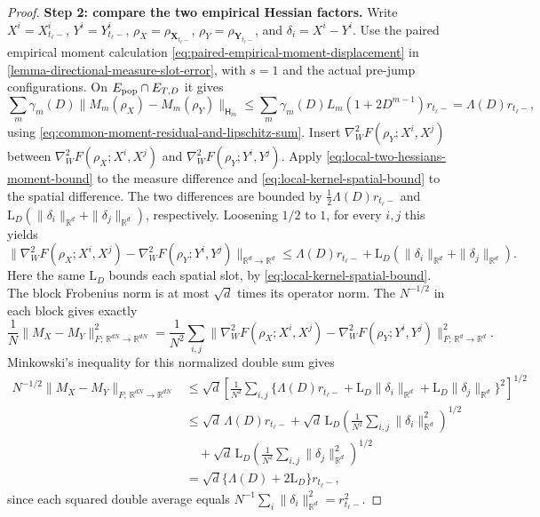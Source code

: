 \begin{proof}
\par\noindent\textbf{Step 2: compare the two empirical Hessian factors.}
Write $X^i=X_{t_\ell-}^i$, $Y^i=Y_{t_\ell-}^i$,
$\rho_X=\rho_{\mathbf X_{t_\ell-}}$, $\rho_Y=\rho_{\mathbf Y_{t_\ell-}}$,
and $\delta_i=X^i-Y^i$. Use the paired empirical moment calculation
\eqref{eq:paired-empirical-moment-displacement} in
\cref{lemma-directional-measure-slot-error}, with $s=1$ and the actual
pre-jump configurations. On $E_{\rm pop}\cap E_{T,D}$ it gives
\[
 \sum_m\gamma_m(D)\|M_m(\rho_X)-M_m(\rho_Y)\|_{\mathsf H_m}
 \le\sum_m\gamma_m(D)L_m(1+2D^{m-1})r_{t_\ell-}
 =\Lambda(D)r_{t_\ell-},
\]
using \eqref{eq:common-moment-residual-and-lipschitz-sum}.
Insert $\nabla_W^2F(\rho_Y;X^i,X^j)$ between
$\nabla_W^2F(\rho_X;X^i,X^j)$ and
$\nabla_W^2F(\rho_Y;Y^i,Y^j)$.
Apply \eqref{eq:local-two-hessians-moment-bound} to the measure difference
and \eqref{eq:local-kernel-spatial-bound} to the spatial difference.
The two differences are bounded by
$\tfrac12\Lambda(D)r_{t_\ell-}$ and
$\mathrm L_D(\|\delta_i\|_{\mathbb R^d}+\|\delta_j\|_{\mathbb R^d})$, respectively.
Loosening $1/2$ to $1$, for every $i,j$ this yields
\[
\|\nabla_W^2F(\rho_X;X^i,X^j)
-\nabla_W^2F(\rho_Y;Y^i,Y^j)\|_{\mathbb R^d\to\mathbb R^d}
\le\Lambda(D)r_{t_\ell-}+\mathrm L_D(\|\delta_i\|_{\mathbb R^d}+\|\delta_j\|_{\mathbb R^d}).
\]
Here the same $\mathrm L_D$ bounds each spatial slot, by \cref{eq:local-kernel-spatial-bound}.
The block Frobenius norm is at most $\sqrt d$ times its operator norm.
The $N^{-1/2}$ in each block gives exactly
\[
 \frac1N\|M_X-M_Y\|_{F;\,\mathbb R^{dN}\to\mathbb R^{dN}}^2
 =\frac1{N^2}\sum_{i,j}
 \|\nabla_W^2F(\rho_X;X^i,X^j)-\nabla_W^2F(\rho_Y;Y^i,Y^j)\|_{F;\,\mathbb R^d\to\mathbb R^d}^2.
\]
Minkowski's inequality for this normalized double sum gives
\[
\begin{aligned}
 N^{-1/2}\|M_X-M_Y\|_{F;\,\mathbb R^{dN}\to\mathbb R^{dN}}
 &\le\sqrt d\left[\frac1{N^2}\sum_{i,j}
  \{\Lambda(D)r_{t_\ell-}+\mathrm L_D\|\delta_i\|_{\mathbb R^d}
                              +\mathrm L_D\|\delta_j\|_{\mathbb R^d}\}^2\right]^{1/2}\\
 &\le\sqrt d\,\Lambda(D)r_{t_\ell-}
       +\sqrt d\,\mathrm L_D\left(\frac1{N^2}\sum_{i,j}\|\delta_i\|_{\mathbb R^d}^2\right)^{1/2}\\
 &\quad+\sqrt d\,\mathrm L_D\left(\frac1{N^2}\sum_{i,j}\|\delta_j\|_{\mathbb R^d}^2\right)^{1/2}\\
 &=\sqrt d\{\Lambda(D)+2\mathrm L_D\}r_{t_\ell-},
\end{aligned}
\]
since each squared double average equals
$N^{-1}\sum_i\|\delta_i\|_{\mathbb R^d}^2=r_{t_\ell-}^2$.


\end{proof}
